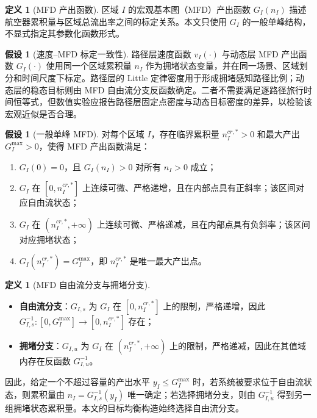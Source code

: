 \documentclass[a4paper,12pt]{article}
\theoremstyle{plain}
\theoremstyle{definition}
\newtheorem{definition}[theorem]{定义}
\newtheorem{assumption}[theorem]{假设}
\theoremstyle{remark}
\begin{document}
\begin{definition}[MFD 产出函数]\label{def:mfd}
区域 $I$ 的宏观基本图（MFD）产出函数 $G_I(n_I)$ 描述航空器累积量与区域总流出率之间的标定关系。本文只使用 $G_I$ 的一般单峰结构，不显式指定其参数化函数形式。
\end{definition}

\begin{assumption}[速度--MFD 标定一致性]\label{asm:calibration_consistency}
路径层速度函数 $v_I(\cdot)$ 与动态层 MFD 产出函数 $G_I(\cdot)$ 使用同一个区域累积量 $n_I$ 作为拥堵状态变量，并在同一场景、区域划分和时间尺度下标定。路径层的 Little 定律密度用于形成拥堵感知路径比例；动态层的稳态目标则由 MFD 自由流分支反函数确定。二者不需要满足逐路径旅行时间恒等式，但数值实验应报告路径层固定点密度与动态目标密度的差异，以检验该宏观近似是否合理。
\end{assumption}

\begin{assumption}[一般单峰 MFD]\label{asm:mfd_unimodal}
对每个区域 $I$，存在临界累积量 $n_I^{cr,*}>0$ 和最大产出 $G_I^{\max}>0$，使得 MFD 产出函数满足：
\begin{enumerate}
    \item $G_I(0)=0$，且 $G_I(n_I)>0$ 对所有 $n_I>0$ 成立；
    \item $G_I$ 在 $[0,n_I^{cr,*}]$ 上连续可微、严格递增，且在内部点具有正斜率；该区间对应自由流状态；
    \item $G_I$ 在 $(n_I^{cr,*},+\infty)$ 上连续可微、严格递减，且在内部点具有负斜率；该区间对应拥堵状态；
    \item $G_I(n_I^{cr,*})=G_I^{\max}$，即 $n_I^{cr,*}$ 是唯一最大产出点。
\end{enumerate}
\end{assumption}

\begin{definition}[MFD 自由流分支与拥堵分支]\label{def:mfd_branches}
\begin{itemize}
    \item \textbf{自由流分支}：$G_{I,s}$ 为 $G_I$ 在 $[0,n_I^{cr,*}]$ 上的限制，严格递增，因此 $G_{I,s}^{-1}:[0,G_I^{\max}]\to[0,n_I^{cr,*}]$ 存在；
    \item \textbf{拥堵分支}：$G_{I,u}$ 为 $G_I$ 在 $(n_I^{cr,*},+\infty)$ 上的限制，严格递减，因此在其值域内存在反函数 $G_{I,u}^{-1}$。
\end{itemize}
因此，给定一个不超过容量的产出水平 $y_I\le G_I^{\max}$ 时，若系统被要求位于自由流状态，则累积量由 $n_I=G_{I,s}^{-1}(y_I)$ 唯一确定；若选择拥堵分支，则由 $G_{I,u}^{-1}$ 得到另一组拥堵状态累积量。本文的目标均衡构造始终选择自由流分支。
\end{definition}
\end{document}
